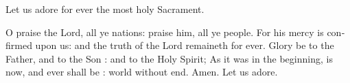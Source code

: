 \begin{otherlanguage}{english}Let us adore for ever the most holy Sacrament.

O praise the Lord, all ye nations: praise him, all ye people. For his mercy is confirmed upon us: and the truth of the Lord remaineth for ever. Glory be to the Father, and to the Son : and to the Holy Spirit; As it was in the beginning, is now, and ever shall be : world without end. Amen. Let us adore.\end{otherlanguage}